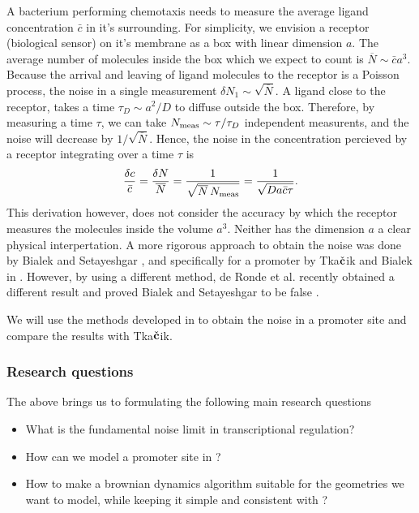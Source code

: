 A bacterium performing chemotaxis needs to measure the average ligand concentration $\bar{c}$ in it's surrounding. For simplicity, we envision a receptor (biological sensor) on it's membrane as a box with linear dimension $a$. The average number of molecules inside the box which we expect to count is $\overline{N} \sim \bar{c} a^3$. Because the arrival and leaving of ligand molecules to the receptor is a Poisson process, the noise in a single measurement $\delta N_1 \sim \sqrt{\overline{N}}$. A ligand close to the receptor, takes a time $\tau_D \sim a^2/D$ to diffuse outside the box. Therefore, by measuring a time $\tau$, we can take $N_{\rm meas} \sim \tau/\tau_D$ independent measurents, and the noise will decrease by $1/\sqrt{\overline{N}}$. Hence, the noise in the concentration percieved by a receptor integrating over a time $\tau$ is
\begin{equation}
 \frac{\delta c}{\bar{c}} = \frac{\delta N}{\overline{N}} = \frac{1}{\sqrt{\overline{N}\,N_{\rm meas}}} = \frac{1}{\sqrt{D a \bar{c} \tau}}.
\end{equation}
This derivation however, does not consider the accuracy by which the receptor measures the molecules inside the volume $a^3$. Neither has the dimension $a$ a clear physical interpertation. A more rigorous approach to obtain the noise was done by Bialek and Setayeshgar \cite{Bialek2005}, and specifically for a promoter by Tka$\check{\bf c}$ik and Bialek in \cite{Tkacik2009}. However, by using a different method, de Ronde et al. recently obtained a different result and proved Bialek and Setayeshgar to be false \cite{DeRonde2012}.

We will use the methods developed in \cite{DeRonde2012} to obtain the noise in a promoter site and compare the results with Tka$\check{\bf c}$ik.

\subsubsection{Research questions}
The above brings us to formulating the following main research questions
\begin{itemize}
 \item What is the fundamental noise limit in transcriptional regulation?
 \item How can we model a promoter site in \GFRD?
 \item How to make a brownian dynamics algorithm suitable for the geometries we want to model, while keeping it simple and consistent with \GFRD?
\end{itemize}



